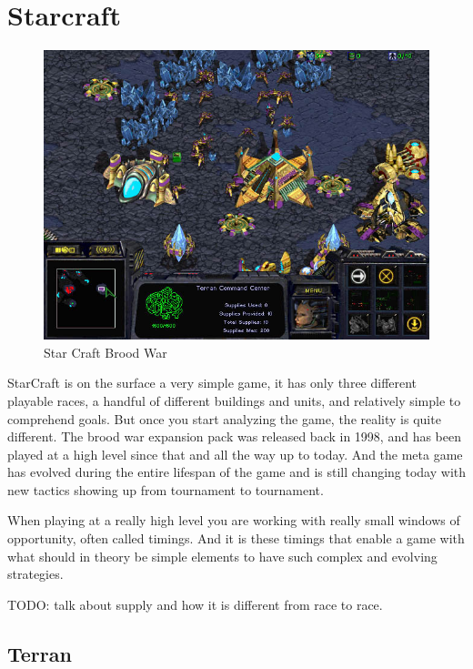 
\section{Starcraft}

\begin{figure}[h!tb]
\centering
\includegraphics[scale=0.5]{graphics/scbw.jpg}
\caption{Star Craft Brood War}
\label{fig:scbwIntro}
\end{figure}

StarCraft is on the surface a very simple game, it has only three different playable races, a
handful of different buildings and units, and relatively simple to comprehend
goals. But once you start analyzing the game, the reality is quite different. The brood war expansion pack was released back in 1998, and has been played at a high level since that and all the way up to today. And the meta game has evolved during the entire lifespan of the game and is still changing today with new tactics showing up from tournament to tournament.
\cite{blizzardstarcraft}

When playing at a really high level you are working with really small windows of opportunity, often called timings. And it is these timings that enable a game with what should in theory be simple elements to have such complex and evolving strategies.

TODO: talk about supply and how it is different from race to race. 

\subsection{Terran}

